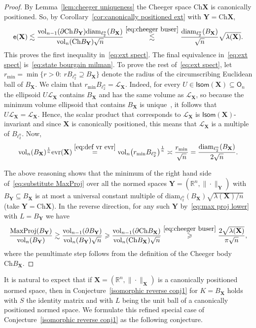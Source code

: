 \documentclass[11pt,reqno]{amsart}
\renewcommand{\ge}{\geqslant}
\newcommand{\diam}{\mathrm{diam}}
\newcommand{\evr}{\mathrm{evr}}
\newcommand{\X}{\mathbf X}
\newcommand{\Y}{\mathbf Y}
\newcommand{\R}{\mathbb R}
\theoremstyle{remark}
\renewcommand{\subset}{\subseteq}
\newcommand{\Ch}{\mathrm{Ch}}
\newcommand{\ee}{\mathsf{e}}
\newcommand{\vol}{\mathrm{vol}}
\renewcommand{\1}{\mathbf 1}
\begin{document}
\begin{proof} By Lemma~\ref{lem:cheeger uniqueness} the Cheeger space $\Ch\X$ is canonically positioned. So, by Corollary~\ref{cor:canonically positioned ext} with $\Y=\Ch\X$,
$$
\ee(\X)\lesssim \frac{\vol_{n-1}(\partial \Ch B_\Y)\diam_{\ell_2^n}(B_\X)}{\vol_n(\Ch B_\Y)\sqrt{n}}\stackrel{\eqref{eq:cheeger buser}}{\lesssim}\frac{\diam_{\ell_2^n}(B_\X)}{\sqrt{n}}\sqrt{\lambda(\X)}.
$$
This proves the first inequality in~\eqref{eq:ext spect}. The final equivalence in~\eqref{eq:ext spect} is~\eqref{eq:state bourgain milman}. To prove the rest of~\eqref{eq:ext spect}, let  $r_{\min}=\min\{r>0:\ r B_{\ell_2^n}\supseteq B_\X\}$ denote the radius of the circumscribing Euclidean ball of $B_\X$.  We claim that $r_{\min}B_{\ell_2^n}=\mathscr{L}_\X$. Indeed, for every $U\in \mathsf{Isom}(\X)\subset \mathsf{O}_n$ the ellipsoid  $U\mathscr{L}_\X$ contains $B_\X$ and has the same volume as $\mathscr{L}_\X$, so because the minimum volume ellipsoid that contains $B_\X$ is unique~\cite{Joh48}, it follows  that $U\mathscr{L}_\X=\mathscr{L}_\X$. Hence, the scalar product that corresponds to $\mathscr{L}_\X$ is $\mathsf{Isom}(\X)$-invariant and since $\X$ is canonically positioned, this means that $\mathscr{L}_\X$ is a multiple of $B_{\ell_2^n}$. Now,
\begin{equation*}
\vol_n(B_\X)^{\frac{1}{n}}\evr(\X)\stackrel{\eqref{eq:def vr evr}}{=}\vol_n\big(r_{\min} B_{\ell_2^n}\big)^{\frac{1}{n}}\asymp \frac{r_{\min}}{\sqrt{n}} = \frac{\diam_{\ell_2^n}(B_\X)}{2\sqrt{n}}.
\end{equation*}


The above reasoning shows that the minimum of the right hand side of~\eqref{eq:substitute MaxProj} over all the normed spaces $\Y=(\R^n,\|\cdot\|_\Y)$ with $B_\Y\subset B_\X$ is at most a universal constant multiple of $\diam_{\ell_2^n}(B_\X)\sqrt{\lambda(\X)/n}$ (take $\Y=\Ch\X$). In the reverse direction, for any such $\Y$ by~\eqref{eq:max proj lower} with $L=B_\Y$ we have
$$
\frac{\mathrm{MaxProj}(B_\Y)}{\vol_n(B_\Y)}\gtrsim \frac{\vol_{n-1}(\partial B_\Y)}{\vol_n(B_\Y)\sqrt{n}}\ge \frac{\vol_{n-1}(\partial \Ch B_\X)}{\vol_n(\Ch B_\X)\sqrt{n}}\stackrel{\eqref{eq:cheeger buser}}{\ge} \frac{2\sqrt{\lambda(\X)}}{\pi\sqrt{n}},
$$
where the penultimate step follows from the definition of the Cheeger body $\Ch B_\X$.
\end{proof}

It is natural to expect that if $\X=(\R^n,\|\cdot\|_\X)$ is a canonically positioned normed space, then in Conjecture~\ref{isomorphic reverse conj1} for $K=B_\X$ holds with $S$ the identity matrix and with $L$ being the unit ball of a canonically positioned normed space. We formulate this refined special case of Conjecture~\ref{isomorphic reverse conj1} as the following conjecture.
\end{document}
